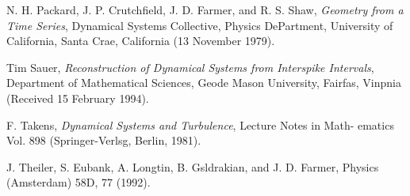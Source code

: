 \documentclass[10pt]{article}
\begin{document}
\begin{thebibliography}{99}
 
N. H. Packard, J. P. Crutchfield, J. D. Farmer, and R. S. Shaw, {\it Geometry from a Time Series}, Dynamical Systems Collective, Physics DePartment, University of California, Santa Crae, California (13 November 1979).

Tim Sauer, {\it Reconstruction of Dynamical Systems from Interspike Intervals}, Department of Mathematical Sciences, Geode Mason University, Fairfas, Vinpnia (Received 15 February 1994).

F. Takens, {\it Dynamical Systems and Turbulence}, Lecture Notes in Math-
ematics Vol. 898 (Springer-Verlsg, Berlin, 1981).

J. Theiler, S. Eubank, A. Longtin, B. Gsldrakian, and
J. D. Farmer, Physics (Amsterdam) 58D, 77 (1992).

\end{thebibliography}
\end{document}
